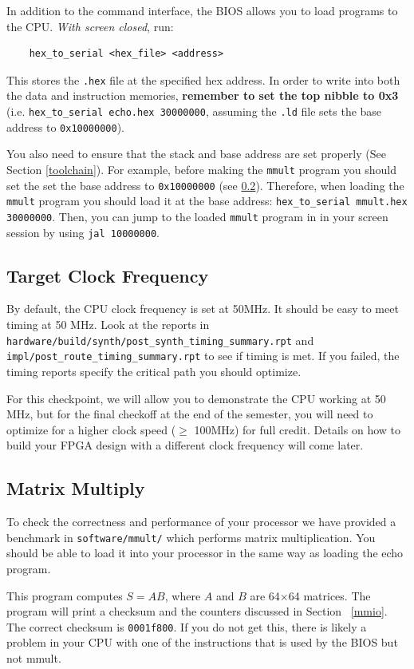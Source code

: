 \documentclass[11pt]{article}
\begin{document}
In addition to the command interface, the BIOS allows you to load programs to the CPU. \textit{With screen closed}, run:
\begin{verbatim}
    hex_to_serial <hex_file> <address>
\end{verbatim}

This stores the \verb|.hex| file at the specified hex address.
In order to write into both the data and instruction memories, \textbf{remember to set the top nibble to 0x3} (i.e. \verb|hex_to_serial echo.hex 30000000|, assuming the \verb|.ld| file sets the base address to \verb|0x10000000|).

You also need to ensure that the stack and base address are set properly (See Section \ref{toolchain}).
For example, before making the \verb|mmult| program you should set the set the base address to \verb|0x10000000| (see \ref{mmult}).
Therefore, when loading the \verb|mmult| program you should load it at the base address: \verb|hex_to_serial mmult.hex 30000000|.
Then, you can jump to the loaded \verb|mmult| program in in your screen session by using \verb|jal 10000000|.

\subsection{Target Clock Frequency}
By default, the CPU clock frequency is set at 50MHz.
It should be easy to meet timing at 50 MHz.
Look at the reports in \verb|hardware/build/synth/post_synth_timing_summary.rpt| and \verb|impl/post_route_timing_summary.rpt| to see if timing is met.
If you failed, the timing reports specify the critical path you should optimize.

For this checkpoint, we will allow you to demonstrate the CPU working at 50 MHz, but for the final checkoff at the end of the semester, you will need to optimize for a higher clock speed ($\geq$ 100MHz) for full credit.
Details on how to build your FPGA design with a different clock frequency will come later.

\subsection{Matrix Multiply}
\label{mmult}
To check the correctness and performance of your processor we have provided a benchmark in \verb|software/mmult/| which performs matrix multiplication.
You should be able to load it into your processor in the same way as loading the echo program.

This program computes $S=AB$, where $A$ and $B$ are 64$\times$64 matrices.
The program will print a checksum and the counters discussed in Section ~\ref{mmio}.
The correct checksum is \verb|0001f800|.
If you do not get this, there is likely a problem in your CPU with one of the instructions that is used by the BIOS but not mmult.
\end{document}
